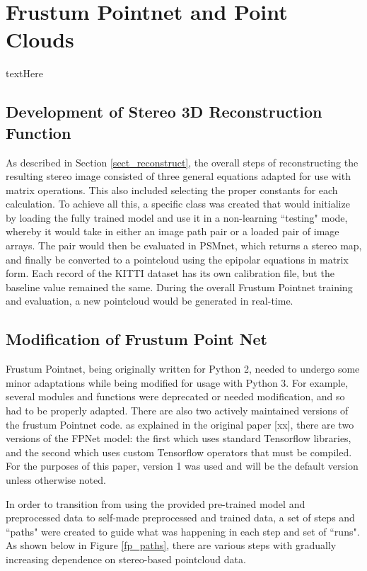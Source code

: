 \newpage
\section{Frustum Pointnet and Point Clouds} %
textHere





\subsection{Development of Stereo 3D Reconstruction Function}
As described in Section \ref{sect_reconstruct}, the overall steps of reconstructing the resulting stereo image consisted of three general equations adapted for use with matrix operations. This also included selecting the proper constants for each calculation. To achieve all this, a specific class was created that would initialize by loading the fully trained model and use it in a non-learning ``testing" mode, whereby it would take in either an image path pair or a loaded pair of image arrays. The pair would then be evaluated in PSMnet, which returns a stereo map, and finally be converted to a pointcloud using the epipolar equations in matrix form. Each record of the KITTI dataset has its own calibration file, but the baseline value remained the same. During the overall Frustum Pointnet training and evaluation, a new pointcloud would be generated in real-time.

\subsection{Modification of Frustum Point Net}
Frustum Pointnet, being originally written for Python 2, needed to undergo some minor adaptations while being modified for usage with Python 3. For example, several modules and functions were deprecated or needed modification, and so had to be properly adapted. There are also two actively maintained versions of the frustum Pointnet code. as explained in the original paper [xx], there are two versions of the FPNet model: the first which uses standard Tensorflow libraries, and the second which uses custom Tensorflow operators that must be compiled. For the purposes of this paper, version 1 was used and will be the default version unless otherwise noted.

In order to transition from using the provided pre-trained model and preprocessed data to self-made preprocessed and trained data, a set of steps and ``paths" were created to guide what was happening in each step and set of ``runs". As shown below in Figure \ref{fp_paths}, there are various steps with gradually increasing dependence on stereo-based pointcloud data.

